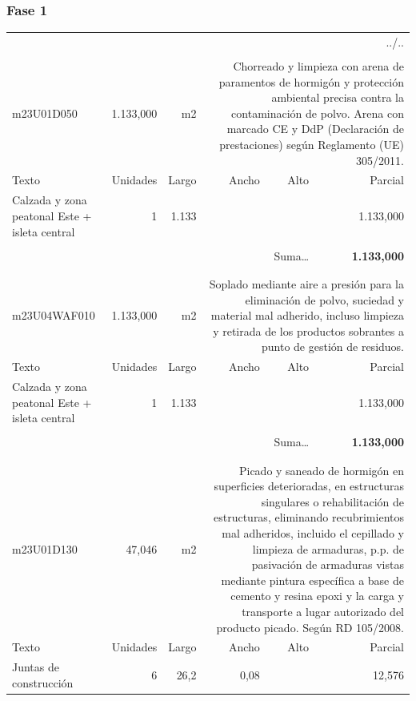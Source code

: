 \documentclass{book}%
\begin{document}
\subsubsection{Fase 1}%
\begin{longtable}{lrrrrr}%
\multicolumn{6}{r}{../..}\\%
\endfoot%
\endlastfoot%
&&&&&\\%
m23U01D050& 1.133,000& m2&\multicolumn{3}{p{6cm}}{\scriptsize Chorreado y limpieza con arena de paramentos de hormigón y protección ambiental precisa contra la contaminación de polvo. Arena con marcado CE y DdP (Declaración de prestaciones) según Reglamento (UE) 305/2011.\normalsize}\\%
Texto&Unidades&Largo&Ancho&Alto&Parcial\\%
\hline%
\multicolumn{1}{p{3.5cm}}{Calzada y zona peatonal Este + isleta central}&1&1.133&&& 1.133,000\\%
&&&&&\\%
\multicolumn{5}{r}{Suma\ldots}&\textbf{ 1.133,000}\\%
\hline%
&&&&&\\%
&&&&&\\%
m23U04WAF010& 1.133,000& m2&\multicolumn{3}{p{6cm}}{\scriptsize Soplado mediante aire a presión para la eliminación de polvo, suciedad y material mal adherido, incluso limpieza y retirada de los productos sobrantes a punto de gestión de residuos.\normalsize}\\%
Texto&Unidades&Largo&Ancho&Alto&Parcial\\%
\hline%
\multicolumn{1}{p{3.5cm}}{Calzada y zona peatonal Este + isleta central}&1&1.133&&& 1.133,000\\%
&&&&&\\%
\multicolumn{5}{r}{Suma\ldots}&\textbf{ 1.133,000}\\%
\hline%
&&&&&\\%
&&&&&\\%
m23U01D130&    47,046& m2&\multicolumn{3}{p{6cm}}{\scriptsize Picado y saneado de hormigón en superficies deterioradas, en estructuras singulares o rehabilitación de estructuras, eliminando recubrimientos mal adheridos, incluido el cepillado y limpieza de armaduras, p.p. de pasivación de armaduras vistas mediante pintura específica a base de cemento y resina epoxi y la carga y transporte a lugar autorizado del producto picado. Según RD 105/2008.\normalsize}\\%
Texto&Unidades&Largo&Ancho&Alto&Parcial\\%
\hline%
\multicolumn{1}{p{3.5cm}}{Juntas de construcción}&6&26,2&0,08&&    12,576\\%

\end{longtable}
\end{document}
